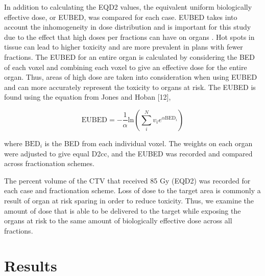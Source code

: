 \documentclass[osajnl,twocolumn,showpacs,superscriptaddress,10pt]{revtex4-1}
\begin{document}
In addition to calculating the EQD2 values, the equivalent uniform biologically effective dose, or EUBED, was compared for each case. EUBED takes into account the inhomogeneity in dose distribution and is important for this study due to the effect that high doses per fractions can have on organs \cite{EUBED, EQD2good}. Hot spots in tissue can lead to higher toxicity and are more prevalent in plans with fewer fractions. The EUBED for an entire organ is calculated by considering the BED of each voxel and combining each voxel to give an effective dose for the entire organ. Thus, areas of high dose are taken into consideration when using EUBED and can more accurately represent the toxicity to organs at risk. The EUBED is found using the equation from Jones and Hoban [12],

\begin{equation}\label{eq:EUBED}
    \text{EUBED} = -\frac{1}{\alpha} \text{ln} \left(\sum_{i}^{N}v_i e^{\alpha \text{BED}_i}\right)
\end{equation}

where $\text{BED}_i$ is the BED from each individual voxel. The weights on each organ were adjusted to give equal D2cc, and the EUBED was recorded and compared across fractionation schemes.

The percent volume of the CTV that received 85 Gy (EQD2) was recorded for each case and fractionation scheme. Loss of dose to the target area is commonly a result of organ at risk sparing in order to reduce toxicity. Thus, we examine the amount of dose that is able to be delivered to the target while exposing the organs at risk to the same amount of biologically effective dose across all fractions. 


\section{Results}
\end{document}
